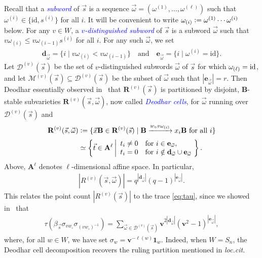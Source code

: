 \documentclass[submission]{FPSAC2025}
\newcommand{\dfemph}[1]{\textcolor{blue}{\emph{#1}}}
\newcommand{\id}{\mathrm{id}}
\newcommand{\x}{\mathbf{v}}
\begin{document}
Recall that a \dfemph{subword} of $\vec{s}$ is a sequence $\vec{\omega} = (\omega^{(1)}, \ldots, \omega^{(\ell)})$ such that $\omega^{(i)} \in \{\id, s^{(i)}\}$ for all $i$.
It will be convenient to write $\omega_{(i)} \vcentcolon= \omega^{(1)} \cdots \omega^{(i)}$ below.
For any $v \in W$, a \dfemph{$v$-distinguished subword} of $\vec{s}$ is a subword $\vec{\omega}$ such that $v\omega_{(i)}  \leq v\omega_{(i - 1)} s^{(i)}$ for all $i$.
For any such $\vec{\omega}$, we set
\begin{align}
\mathbf{d}_{\vec{\omega}} = \{i \mid v\omega_{(i)} < v\omega_{(i - 1)}\}
	\quad\text{and}\quad
	\mathbf{e}_{\vec{\omega}} = \{i \mid \omega^{(i)} = \id\}.
\end{align}
Let $\mathcal{D}^{(v)}(\vec{s})$ be the set of $v$-distinguished subwords $\vec{\omega}$ of $\vec{s}$ for which $\smash{\omega_{(\ell)}} = \id$, and let $\mathcal{M}^{(v)}(\vec{s}) \subseteq \mathcal{D}^{(v)}(\vec{s})$ be the subset of $\vec{\omega}$ such that $|\mathbf{e}_{\vec{\omega}}| = r$.
Then Deodhar essentially observed in~\cite{deodhar} that $\mathbf{R}^{(v)}(\vec{s})$ is partitioned by disjoint, $\mathbf{B}$-stable subvarieties $\mathbf{R}^{(v)}(\vec{s}, \vec{\omega})$, now called \dfemph{Deodhar cells}, for $\vec{\omega}$ running over $\mathcal{D}^{(v)}(\vec{s})$ and
\begin{align}
\mathbf{R}^{(v)}(\vec{s}, \vec{\omega}) 
	&\vcentcolon= \{\vec{x}\mathbf{B} \in \mathbf{R}^{(v)}(\vec{s}) \mid \text{$\mathbf{B} \xrightarrow{w_\circ v\omega_{(i)}} x_i\mathbf{B}$ for all $i$}\}\\[0.5ex]
	&\simeq \left\{\vec{t} \in \mathbf{A}^\ell\, \middle|
		\begin{array}{ll}
		t_i \neq 0
			&\text{for $i \in \mathbf{e}_{\vec{\omega}}$},\\
		t_i= 0
			&\text{for $i \notin \mathbf{d}_{\vec{\omega}} \cup \mathbf{e}_{\vec{\omega}}$}
		\end{array}\!\right\}.
\end{align}
Above, $\mathbf{A}^\ell$ denotes $\ell$-dimensional affine space.
In particular,
\begin{align}\label{eq:deodhar}
|R^{(v)}(\vec{s}, \vec{\omega})| = q^{|\mathbf{d}_{\vec{\omega}}|} (q - 1)^{|\mathbf{e}_{\vec{\omega}}|}.
\end{align}
This relates the point count $|R^{(v)}(\vec{s})|$ to the trace \eqref{eq:tau}, since we showed in~\cite{gltw} that
\begin{align}\label{eq:gltw}
\tau(\beta_{\vec{s}} \sigma_{vw_\circ} \sigma_{(vw_\circ)^{-1}}) 
= 
	\sum_{\vec{\omega} \in \mathcal{D}^{(v)}(\vec{s})}
	\x^{2|\mathbf{d}_{\vec{\omega}}|} (\x^2 - 1)^{|\mathbf{e}_{\vec{\omega}}|},
\end{align}
where, for all $w \in W$, we have set $\sigma_w = \x^{-\ell(w)} \mathbf{1}_w$.
Indeed, when $W = S_n$, the Deodhar cell decomposition recovers the ruling partition mentioned in \emph{loc.\@ cit.}
\end{document}
